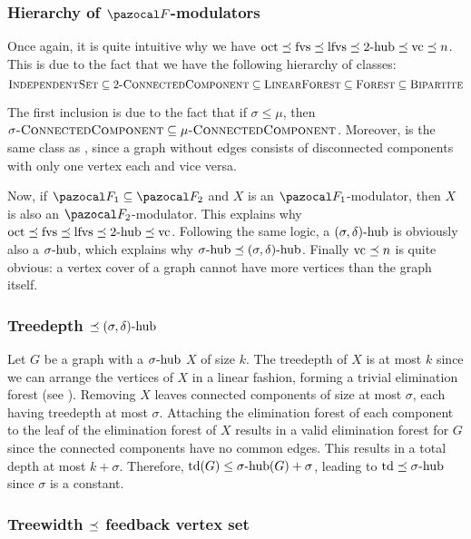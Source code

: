 

\subsubsection*{Hierarchy of $\F$-modulators}

Once again, it is quite intuitive why we have $\oct \lp \fvs \lp \lfvs \lp \shub[2] \lp \vc \lp n$. This is due to the fact that we have the following hierarchy of classes:
$$\prob{IndependentSet} \subseteq \prob{$2$-ConnectedComponent} \subseteq \prob{LinearForest} \subseteq \prob{Forest} \subseteq \prob{Bipartite}$$

The first inclusion is due to the fact that if $\sigma \leq \mu$, then $\sigma\prob{-ConnectedComponent} \subseteq \mu\prob{-ConnectedComponent}$. Moreover,  is the same class as , since a graph without edges consists of disconnected components with only one vertex each and vice versa.

Now, if $\F_1 \subseteq \F_2$ and $X$ is an $\F_1$-modulator, then $X$ is also an $\F_2$-modulator. This explains why $\oct \lp \fvs \lp \lfvs \lp \shub[2] \lp \vc$. Following the same logic, a $\sdhub$ is obviously also a $\shub$, which explains why $\shub \lp \sdhub$. Finally $\vc \lp n$ is quite obvious: a vertex cover of a graph cannot have more vertices than the graph itself.

\subsubsection*{Treedepth $\lp \sdhub$}

Let $G$ be a graph with a $\shub$ $X$ of size $k$. The treedepth of $X$ is at most $k$ since we can arrange the vertices of $X$ in a linear fashion, forming a trivial elimination forest (see ). Removing $X$ leaves connected components of size at most $\sigma$, each having treedepth at most $\sigma$. Attaching the elimination forest of each component to the leaf of the elimination forest of $X$ results in a valid elimination forest for $G$ since the connected components have no common edges. This results in a total depth at most $k + \sigma$. Therefore, $\td(G) \leq \shub(G) + \sigma$, leading to $\td \lp \shub$ since $\sigma$ is a constant.



\subsubsection*{Treewidth $\lp$ feedback vertex set}

